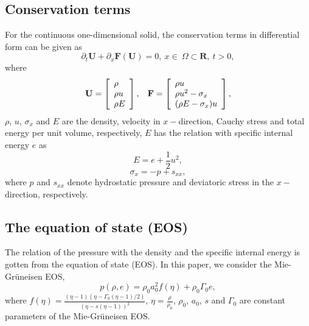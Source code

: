 \documentclass{article}
\numberwithin{equation}{section}
\numberwithin{table}{section}
\begin{document}
\subsection{Conservation terms}
For  the  continuous one-dimensional solid, the conservation terms  in differential form can be  given as
\begin{equation*}
\partial_t \mathbf{{U}} + \partial _x \bm{F}(\mathbf{{U}}) = 0, \   x \in \   \Omega \subset \mathbf{R}, \  t>0,
\end{equation*}
where
\begin{equation}
  \mathbf{U} = \left[ \begin{array}{l}
	  \rho \\
	  \rho u \\
	  \rho  E \\
	\end{array}
  \right],
  \hspace{0.3cm}
  \mathbf{F} = \left[ \begin{array}{l}
	  \rho u \\
	  \rho u^2 -\sigma_x\\
	  (\rho E -\sigma_x)u\\
  \end{array} \right],
\end{equation}
$\rho$, $u$, $\sigma_x$ and $E$ are  the density, velocity in $x-$direction, Cauchy stress and total energy per unit volume, respectively, $E$ has the relation with specific internal energy $e$ as
\begin{equation}
  E = e+\frac{1}{2}u^2,
\end{equation}
\begin{equation}
  \sigma_x = -p +s_{xx},
\end{equation}
where $p$ and $s_{xx}$ denote hydrostatic pressure and deviatoric stress in the $x-$ direction, respectively.

\subsection{The equation of state (EOS)}

The relation of the pressure with  the density and the specific internal energy is gotten from the equation of state (EOS). In this paper, we consider the Mie-Gr\"uneisen EOS,
\begin{equation}\label{eq:mie}
  p(\rho,e) = \rho_0 a_0^2f(\eta)+ \rho_0 \Gamma_0 e,
\end{equation}
where $f(\eta) = \frac{(\eta-1)(\eta-\Gamma_0(\eta-1)/2)}{(\eta-s(\eta-1))^2}$, $\eta = \frac{\rho}{\rho_0}$, $\rho_0$, $a_0$, $s$ and $\Gamma_0$ are constant parameters of the Mie-Gr\"uneisen EOS.
\end{document}
